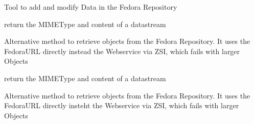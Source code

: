 \documentclass[a4paper,10pt,ngerman]{sphinxmanual}
\begin{document}
\begin{fulllineitems}
\label{tools:Products.DiPP.Fedora2DiPP3Tool.Fedora}
Tool to add and modify Data in the Fedora Repository

\begin{fulllineitems}
\label{tools:Products.DiPP.Fedora2DiPP3Tool.Fedora.access}
return the MIMEType and content of a datastream

\end{fulllineitems}


\begin{fulllineitems}
\label{tools:Products.DiPP.Fedora2DiPP3Tool.Fedora.accessByFedoraURL}
Alternative method to retrieve objects from the Fedora
Repository. It uses the FedoraURL directly instead the Webservice
via ZSI, which fails with larger Objects

\end{fulllineitems}


\begin{fulllineitems}
\label{tools:Products.DiPP.Fedora2DiPP3Tool.Fedora.accessMultiMedia}
return the MIMEType and content of a datastream

\end{fulllineitems}


\begin{fulllineitems}
\label{tools:Products.DiPP.Fedora2DiPP3Tool.Fedora.accessMultiMediaByFedoraURL}
Alternative method to retrieve objects from the Fedora
Repository. It uses the FedoraURL directly insteht the Webservice
via ZSI, which fails with larger Objects

\end{fulllineitems}


\end{fulllineitems}
\end{document}
